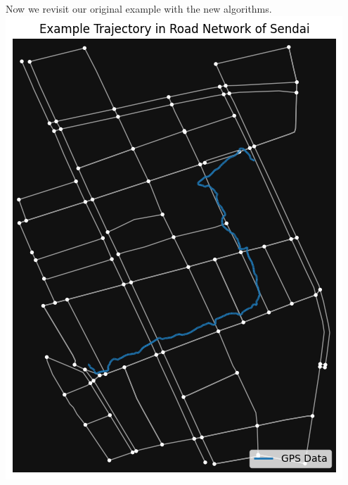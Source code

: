 \documentclass[aspectratio=169, bigfiles, professionalfonts, hyperref={colorlinks=true, allcolors=., urlcolor=blue}]{beamer}
\begin{document}
\begin{frame}
	Now we revisit our original example with the new algorithms.
\centering
  \includegraphics[scale=.45]{trajectoryandroads.png}
  \label{fig:example_traj}
\end{frame}
\end{document}
